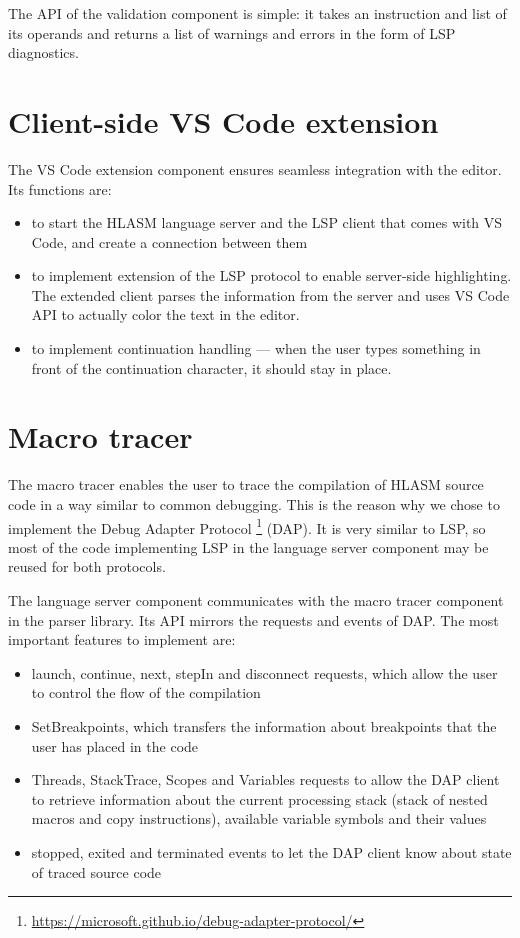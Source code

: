 The API of the validation component is simple: it takes an instruction and list of its operands and returns a list of warnings and errors in the form of LSP diagnostics.

\section{Client-side VS Code extension}
\label{arch:client}

The VS Code extension component ensures seamless integration with the editor. Its functions are:

\begin{itemize}
	\item to start the HLASM language server and the LSP client that comes with VS Code, and create a connection between them
	\item to implement extension of the LSP protocol to enable server-side highlighting. The extended client parses the information from the server and uses VS Code API to actually color the text in the editor.
	\item to implement continuation handling --- when the user types something in front of the continuation character, it should stay in place.
\end{itemize}


\section{Macro tracer}
\label{arch:macro}
The macro tracer enables the user to trace the compilation of HLASM source code in a way similar to common debugging. This is the reason why we chose to implement the Debug Adapter Protocol \footnote{\url{https://microsoft.github.io/debug-adapter-protocol/}} (DAP). It is very similar to LSP, so most of the code implementing LSP in the language server component may be reused for both protocols.

The language server component communicates with the macro tracer component in the parser library. Its API mirrors the requests and events of DAP. The most important features to implement are:

\begin{itemize}
	\item launch, continue, next, stepIn and disconnect requests, which allow the user to control the flow of the compilation
	\item SetBreakpoints, which transfers the information about breakpoints that the user has placed in the code
	\item Threads, StackTrace, Scopes and Variables requests to allow the DAP client to retrieve information about the current processing stack (stack of nested macros and copy instructions), available variable symbols and their values
	\item stopped, exited and terminated events to let the DAP client know about state of traced source code
\end{itemize}

